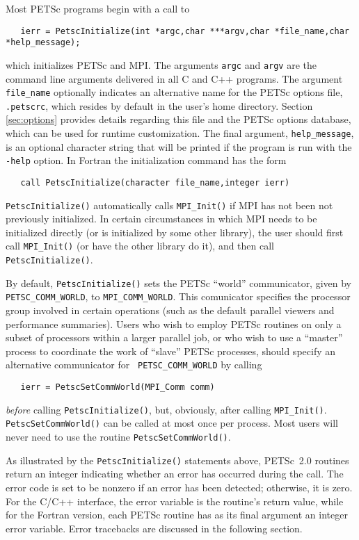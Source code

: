 {Most PETSc programs begin with a call to 
\begin{verbatim}
   ierr = PetscInitialize(int *argc,char ***argv,char *file_name,char *help_message);
\end{verbatim} 
which initializes PETSc and MPI.  The arguments {\tt argc} and 
{\tt argv} are the command line arguments delivered in all C and C++
programs.  The argument {\tt file\_name}
optionally indicates an alternative name for the PETSc options file,
{\tt .petscrc}, which resides by default in the user's home directory.
Section \ref{sec:options} provides details regarding
this file and the PETSc options database, which can be used for runtime
customization. The final argument, {\tt help\_message}, is an optional
character string that will be printed if the program is run with the
{\tt -help} option.  In Fortran the initialization command has the form
\begin{verbatim}
   call PetscInitialize(character file_name,integer ierr)
\end{verbatim} 
{\tt PetscInitialize()} automatically calls {\tt MPI\_Init()} if MPI
has not been not previously initialized. In certain 
circumstances in which MPI needs to be initialized directly (or is
initialized by some other library), the user should first call 
{\tt MPI\_Init()} (or have the other library do it), and then call
{\tt PetscInitialize()}.

By default, {\tt PetscInitialize()} sets the PETSc ``world''
communicator, given by {\tt PETSC\_COMM\_WORLD}, to {\tt MPI\_COMM\_WORLD}.
This comunicator specifies the processor group involved in certain
operations (such as the default parallel viewers and performance
summaries).  Users who wish to employ PETSc routines on only a subset
of processors within a larger parallel job, or who wish to use a
``master'' process to coordinate the work of ``slave'' PETSc
processes, should specify an alternative communicator for {\tt
PETSC\_COMM\_WORLD} by calling 
\begin{verbatim}
   ierr = PetscSetCommWorld(MPI_Comm comm)
\end{verbatim}
{\em before} calling {\tt PetscInitialize()}, but, obviously, after
calling {\tt MPI\_Init()}. {\tt PetscSetCommWorld()} can be called
at most once per process. Most users will never need to use the routine
{\tt PetscSetCommWorld()}.

As illustrated by the {\tt PetscInitialize()} statements above,
PETSc~2.0 routines return an integer indicating whether an error has
occurred during the call.  The error code is set to be nonzero if an
error has been detected; otherwise, it is zero.  For the C/C++
interface, the error variable is the routine's return value, while for
the Fortran version, each PETSc routine has as its final argument an
integer error variable.  Error tracebacks are discussed in the following
section.

}
